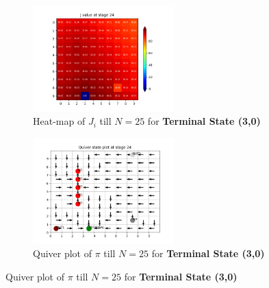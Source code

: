 \begin{figure}[h]
\begin{subfigure}
\centering
\includegraphics[angle=0,width=0.6\textwidth]{hw2/logs/t=3_N=25/J-heatmap-24.png}
\caption{Heat-map of $J_i$ till $N=25$ for \textbf{Terminal State (3,0)}}
\end{subfigure}

\begin{subfigure}
\centering
\includegraphics[angle=0,width=0.6\textwidth]{hw2/logs/t=3_N=25/quiver-24.png}
\caption{Quiver plot of $\pi$ till $N=25$ for \textbf{Terminal State (3,0)}}
\end{subfigure}
\end{figure}
